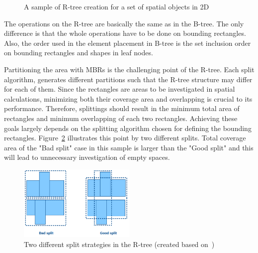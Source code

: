 \documentclass[a4paper,12pt]{article}
\begin{document}
\begin{figure}
\centering
{}
\centering
{}
\caption{A sample of R-tree creation for a set of spatial objects in 2D}
\label{rtree}
\end{figure}

The operations on the R-tree are basically the same as in the B-tree. The only difference is that the 
whole operations have to be done on bounding rectangles.
Also, the order used in the element placement in B-tree
is the set inclusion order on bounding rectangles and shapes in leaf nodes. 

Partitioning the area with MBRs is the challenging point of the R-tree. Each split algorithm, generates different partitions such that the R-tree structure may differ for each of them. Since the rectangles are areas to be investigated in spatial calculations, minimizing both their coverage area and overlapping is crucial to its performance. Therefore, splittings should result in the minimum total area of rectangles and minimum overlapping of each two rectangles. 
Achieving these goals largely depends on the splitting algorithm chosen for defining the bounding rectangles. Figure~\ref{rtreesplit} illustrates this point by two different splits. Total coverage area of the "Bad split" case in this sample is larger than the "Good split" and this will lead to unnecessary investigation of empty spaces.

\begin{figure}
\centering
\includegraphics[width=0.5\textwidth,height=0.17\textheight]{R-treeMBR}
\caption{Two different split strategies in the R-tree (created based on~\cite{rtree})}
\label{rtreesplit}
\end{figure}
\end{document}

